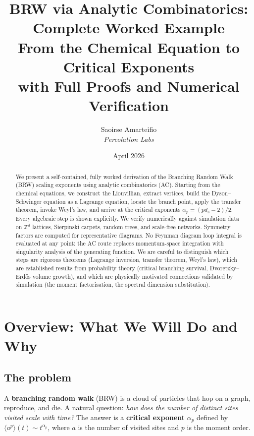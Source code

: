 \documentclass[11pt,a4paper]{article}
\title{%
\textbf{BRW via Analytic Combinatorics: Complete Worked Example}\\[0.5em]
\large From the Chemical Equation to Critical Exponents \\
with Full Proofs and Numerical Verification
}
\author{
Saoirse Amarteifio\\
\small \textit{Percolation Labs}
}
\date{April 2026}
\theoremstyle{definition}
\begin{document}
\maketitle

\begin{abstract}
We present a self-contained, fully worked derivation of the Branching Random Walk
(BRW) scaling exponents using analytic combinatorics (AC). Starting from
the chemical equations, we construct the Liouvillian, extract vertices,
build the Dyson--Schwinger equation as a Lagrange equation, locate the
branch point, apply the transfer theorem, invoke Weyl's law, and arrive
at the critical exponents $\alpha_p = (pd_s - 2)/2$. Every algebraic step
is shown explicitly. We verify numerically against simulation data on
$\mathbb{Z}^d$ lattices, Sierpinski carpets, random trees, and scale-free
networks. Symmetry factors are computed for representative diagrams.
No Feynman diagram loop integral is evaluated at any point: the AC route
replaces momentum-space integration with singularity analysis of the
generating function. We are careful to distinguish which steps are
rigorous theorems (Lagrange inversion, transfer theorem, Weyl's law),
which are established results from probability theory (critical branching
survival, Dvoretzky--Erd\H{o}s volume growth), and which are physically
motivated connections validated by simulation (the moment factorisation,
the spectral dimension substitution).
\end{abstract}

\tableofcontents
\clearpage

\section{Overview: What We Will Do and Why}
\label{sec:overview}

\subsection{The problem}

A \textbf{branching random walk} (BRW) is a cloud of particles that hop
on a graph, reproduce, and die. A natural question: \emph{how does the
number of distinct sites visited scale with time?} The answer is a
\textbf{critical exponent} $\alpha_p$ defined by
$\langle a^p \rangle(t) \sim t^{\alpha_p}$, where $a$ is the number of
visited sites and $p$ is the moment order.
\end{document}
